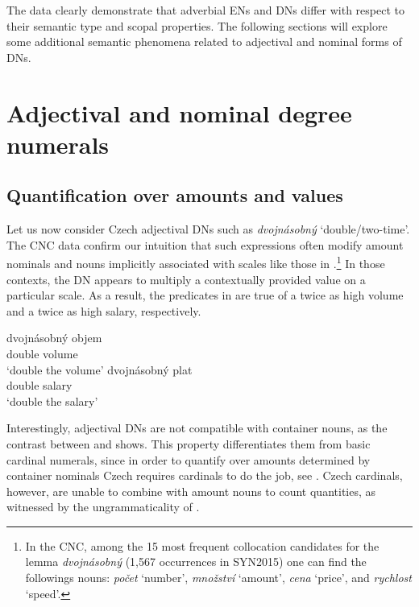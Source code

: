 \documentclass[output=paper,modfonts,hidelinks,newtxmath
\ChapterDOI{10.5281/zenodo.2545513}
]{langscibook}
\begin{document}
\noindent The data clearly demonstrate that adverbial ENs and DNs differ with respect to their semantic type and scopal properties. The following sections will explore some additional semantic phenomena related to adjectival and nominal forms of DNs.

\section{Adjectival and nominal degree numerals}\label{adjectival-and-nominal-degree-numerals}

\subsection{Quantification over amounts and values}\label{quantification-over-amounts}

Let us now consider Czech adjectival DNs such as \textit{dvojnásobný} `double/two-time'. The CNC data confirm our intuition that such expressions often modify amount nominals and nouns implicitly associated with scales like those in .\footnote{In the CNC, among the 15 most frequent collocation candidates for the lemma \textit{dvojnásobný} (1,567 occurrences in SYN2015) one can find the followings nouns: \textit{počet} `number', \textit{množství} `amount', \textit{cena} `price', and \textit{rychlost} `speed'.} In those contexts, the DN appears to multiply a contextually provided value on a particular scale. As a result, the predicates in  are true of a twice as high volume and a twice as high salary, respectively.

\ea\label{dvojnasobny-amount-scales} \ea \gll dvojnásobný objem\label{dvojnasobny-objem}\\
double volume\\
\glt `double the volume'
\ex \gll dvojnásobný plat\\
double salary\\
\glt `double the salary'
\z  \z

\noindent Interestingly, adjectival DNs are not compatible with container nouns, as the contrast between  and  shows. This property differentiates them from basic cardinal numerals, since in order to quantify over amounts determined by container nominals Czech requires cardinals to do the job, see . Czech cardinals, however, are unable to combine with amount nouns to count quantities, as witnessed by the ungrammaticality of .
\end{document}
